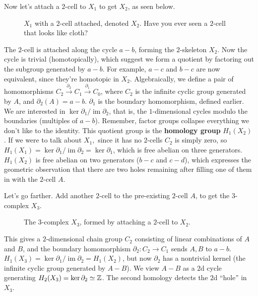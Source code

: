 Now let's attach a $2$-cell to $X_1$ to get $X_2$, as seen below.
\begin{figure}[H]
    \centering
    \caption{$X_1$ with a $2$-cell attached, denoted $X_2$. Have you ever seen a $2$-cell that looks like cloth?}
    \label{x2}
\end{figure}
The $2$-cell is attached along the cycle $a-b$, forming the $2$-skeleton $X_2$. Now the cycle is trivial (homotopically), which suggest we form a quotient by factoring out the subgroup generated by $a-b$. For example, $a-c$ and $b-c$ are now equivalent, since they're homotopic in $X_2$. Algebraically, we define a pair of homomorphisms $C_2 \overset{\partial_2}{\longrightarrow}C_1\overset{\partial_1}{\longrightarrow}C_0  $, where $C_2$ is the infinite cyclic group generated by $A$, and $\partial_2(A)=a-b$. $\partial_1 $ is the boundary homomorphism, defined earlier. We are interested in $\operatorname{ker}\partial_1 / \operatorname{im}\partial_2  $, that is, the $1$-dimensional cycles modulo the boundaries (multiples of $a-b$). Remember, factor groups collapse everything we don't like to the identity. This quotient group is the \textbf{homology group} $H_1(X_2)$. If we were to talk about $X_1,$ since it has no $2$-cells $C_2$ is simply zero, so $H_1(X_1)=\ker \partial_1 / \operatorname{im}\partial_2=\ker \partial_1  $, which is free abelian on three generators. $H_1(X_2)$ is free abelian on two generators ($b-c$ and $c-d$), which expresses the geometric observation that there are two holes remaining after filling one of them in with the $2$-cell $A$.

Let's go farther. Add another $2$-cell to the pre-existing $2$-cell $A$, to get the $3$-complex $X_3$.
\begin{figure}[H]
    \centering
    \caption{The $3$-complex  $X_3$, formed by attaching a $2$-cell to $X_2$.}
    \label{x3}
\end{figure}
This gives a $2$-dimensional chain group $C_2$ consisting of linear combinations of $A$ and $ B$, and the boundary homomorphism $\partial_2 \colon C_2 \to C_1 $ sends $A,B$ to $a-b$. $H_1(X_3)=\ker \partial_1 / \operatorname{im}\partial_2  =H_1(X_2)$, but now $\partial_2 $ has a nontrivial kernel (the infinite cyclic group generated by $A-B$). We view $A-B$ as a $2$d cycle generating $H_2(X_3)=\ker \partial_2\simeq\mathbb{Z} $. The second homology detects the $2$d ``hole'' in $X_3$. 

